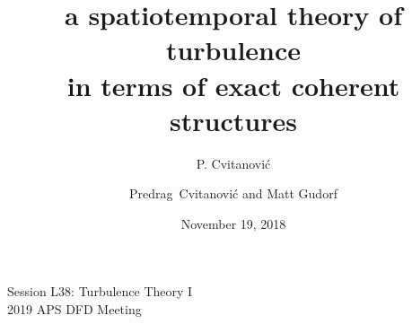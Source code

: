 


\usepackage[font=scriptsize, labelfont=bf]{caption}
\usepackage[
    backend=biber,  %
    sorting=nyt,
    style=numeric, %
    natbib=true,
    style=phys, %
    biblabel= brackets, %
    articletitle=false, %
    pageranges = true , %
    sortlocale=en_US,
    firstinits=true,
    url=false, %
    doi=false, %
    eprint=false
]{biblatex}


\renewcommand{\Ssym}[1]{{\ensuremath{m_{#1}}}}    %

\makeatletter
\let\@@magyar@captionfix\relax
\makeatother




\title{
{a spatiotemporal theory of}
{\huge turbulence}
\\
in terms of exact coherent structures
}
\author{P. Cvitanovi\'c}
\author[Cvitanovi\'c]
{
  \textcolor{green!50!black}{
  {Predrag~Cvitanovi\'c
  and
  Matt Gudorf
  }	%
  }
}
\institute
{
Session L38: Turbulence Theory I
\\
2019 APS DFD Meeting
 }
\date{November 19, 2018}

